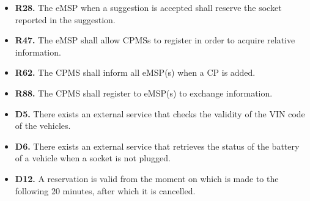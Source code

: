 \documentclass{Configuration_Files/PoliMi3i_thesis}
\begin{document}
\begin{enumerate}[label=\textbf{G\arabic*}]
\begin{itemize}
            \item \textbf{R28.} The eMSP when a suggestion is accepted shall reserve the socket reported in the suggestion.
            \item \textbf{R47.} The eMSP shall allow CPMSs to register in order to acquire relative information.
            \item \textbf{R62.} The CPMS shall inform all eMSP(s) when a CP is added.
            \item \textbf{R88.} The CPMS shall register to eMSP(s) to exchange information.
            \item \textbf{D5.} There exists an external service that checks the validity of the VIN code of the vehicles.
            \item \textbf{D6.} There exists an external service that retrieves the status of the battery of a vehicle when a socket is not plugged.
            \item \textbf{D12.} A reservation is valid from the moment on which is made to the following 20 minutes, after which it is cancelled.
        \end{itemize}


\end{enumerate}
\end{document}
